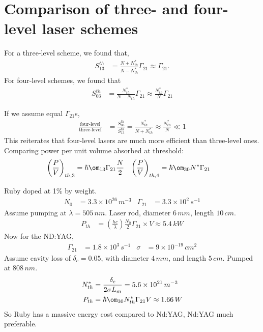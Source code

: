 \documentclass[a4paper, 11pt, normalem]{report}
\begin{document}
\section{Comparison of three- and four-level laser schemes}
\begin{multicols}{2}
For a three-level scheme, we found that,
\begin{align}
    S_{13}^{th} &= \frac{N+N_{th}^*}{N-N_{th}^*}\Gamma_{21} \approx \Gamma_{21}.
\end{align}
For four-level schemes, we found that
\begin{align}
    S_{03}^{th} &= \frac{N_{th}^*}{N-N_{th}}\Gamma_{21} \approx \frac{N_{th}^*}{N}\Gamma_{21}
\end{align}
\end{multicols}
If we assume equal $\Gamma_{21}$s,
\begin{align}
    \frac{\text{four-level}}{\text{three-level}} &= \frac{S_{03}^{th}}{S_{13}^{th}} = \frac{N_{th}^*}{N+N_{th}^*} \approx \frac{N_{th}^*}{N} \ll 1
\end{align}
This reiterates that four-level lasers are much more efficient than three-level ones.
Comparing power per unit volume absorbed at threshold:
\begin{align}
    \left(\frac{P}{V}\right)_{th,3} &= \hbar\om_{13}\Gamma_{21}\frac{N}{2} & \left(\frac{P}{V}\right)_{th,4} &= \hbar\om_{30}N^*\Gamma_{21}
\end{align}

\begin{example}
    Ruby doped at 1\% by weight.
    \begin{align}
        N_0 &= 3.3\times10^{26}\,m^{-3} & \Gamma_{21} &= 3.3\times10^2\,s^{-1}
    \end{align}
    Assume pumping at $\lambda=505\,nm$.
    Laser rod, diameter $6\,mm$, length $10\,cm$.
    \begin{align}
        P_{th} &= \left(\frac{hc}{\lambda}\right)\frac{N_0}{2}\Gamma_{21}\times V \approx 5.4\,kW
    \end{align}
    Now for the ND:YAG,
    \begin{align}
        \Gamma_{21} &= 1.8\times10^3\,s^{-1} & \sigma &= 9\times10^{-19}\,cm^2 
    \end{align}
    Assume cavity loss of $\delta_c = 0.05$, with diameter $4\,mm$, and length $5\,cm$.
    Pumped at $808\,nm$.
    \begin{align}
        N_{th}^* &= \frac{\delta_c}{2\sigma L_m} = 5.6\times10^{21}\,m^{-3} \\
        P_{th} &= \hbar\om_{30}N_{th}^*\Gamma_{21}V \approx 1.66\,W
    \end{align}
    So Ruby has a massive energy cost compared to Nd:YAG, Nd:YAG much preferable.
\end{example}
\end{document}

